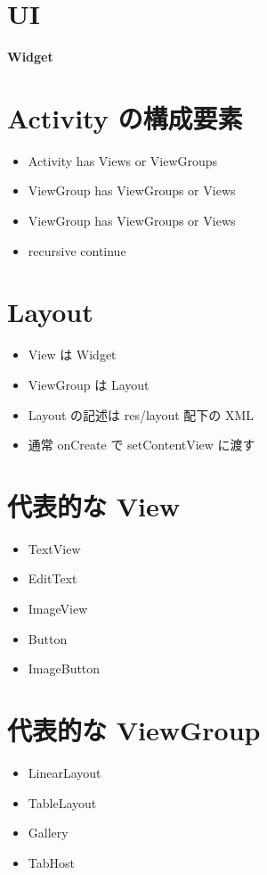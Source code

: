 \documentclass[slide,papersize]{jsarticle}
\begin{document}
\section*{UI}
\vspace*{15mm}
\begin{center}
{\Huge {\bf Widget}}
\end{center}

\section*{Activity の構成要素}
\bigskip
\begin{itemize}
\item Activity has Views or ViewGroups
\bigskip
\item ViewGroup has ViewGroups or Views
\bigskip
\item ViewGroup has ViewGroups or Views
\bigskip
\item recursive continue
\end{itemize}

\section*{Layout}
\bigskip
\begin{itemize}
\item View は Widget
\bigskip
\item ViewGroup は Layout
\bigskip
\item Layout の記述は res/layout 配下の XML
\bigskip
\item 通常 onCreate で setContentView に渡す
\end{itemize}

\section*{代表的な View}
\bigskip
\begin{itemize}
\item TextView
\bigskip
\item EditText
\bigskip
\item ImageView
\bigskip
\item Button
\bigskip
\item ImageButton
\end{itemize}

\section*{代表的な ViewGroup}
\bigskip
\begin{itemize}
\item LinearLayout
\bigskip
\item TableLayout
\bigskip
\item Gallery
\bigskip
\item TabHost
\end{itemize}
\end{document}
